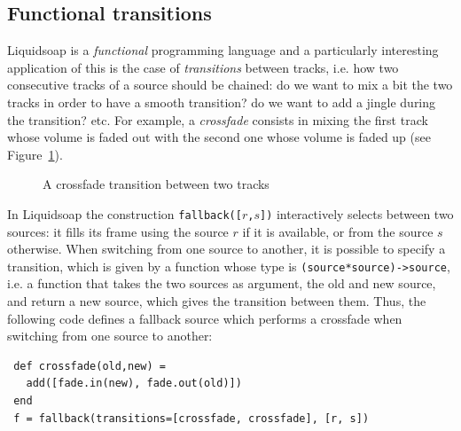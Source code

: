 \documentclass{llncs}
\newcommand{\liquidsoap}{Liquidsoap}
\newcommand{\ie}{{i.e.}}
\newcommand{\fcaption}[1]{\vspace{-3ex}\caption{#1}\vspace{-4ex}}
\begin{document}
\subsection{Functional transitions}
\label{sec:transitions}

\liquidsoap{} is a \emph{functional} programming language and a particularly
interesting application of this is the case of \textit{transitions} between
tracks, \ie{} how two consecutive tracks of a source should be chained: do we
want to mix a bit the two tracks in order to have a smooth transition? do we
want to add a jingle during the transition? etc. For example, a \emph{crossfade}
consists in mixing the first track whose volume is faded out with the second one
whose volume is faded up (see Figure~\ref{fig:cross}).
\vspace{-5ex}
\begin{figure}[h]
 \begin{center}
\end{center}
 \fcaption{A crossfade transition between two tracks}
 \label{fig:cross}
\end{figure}

In \liquidsoap{} the construction \texttt{fallback([$r$,$s$])} interactively
selects between two sources: it fills its frame using the source \texttt{$r$} if
it is available, or from the source \texttt{$s$} otherwise.  When switching from
one source to another, it is possible to specify a transition, which is given by
a function whose type is \hbox{\texttt{(source*source)->source}}, \ie{} a
function that takes the two sources as argument, the old and new source, and
return a new source, which gives the transition between them. Thus, the
following code defines a fallback source which performs a crossfade when
switching from one source to another:
\begin{verbatim}
 def crossfade(old,new) =
   add([fade.in(new), fade.out(old)])
 end
 f = fallback(transitions=[crossfade, crossfade], [r, s])
\end{verbatim}
\end{document}

